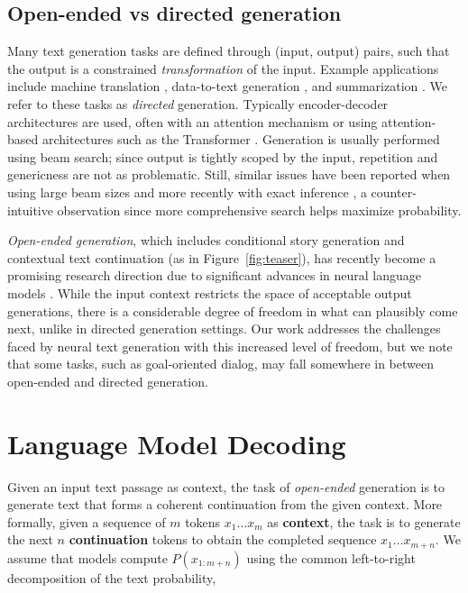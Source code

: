 \subsection{Open-ended vs directed generation} 

Many text generation tasks are defined through (input, output) pairs, such that the output is a constrained \emph{transformation} of the input. Example applications include machine translation \citep{Bahdanau2015NeuralMT}, data-to-text generation \citep{wiseman2017challenges}, and summarization \citep{nallapati2016abstractive}. We refer to these tasks as \emph{directed} generation. Typically encoder-decoder architectures are used, often with an attention mechanism \citep{Bahdanau2015NeuralMT,luong2015effective} or using attention-based architectures such as the Transformer \citep{vaswani2017attention}. Generation is usually performed using beam search; since output is tightly scoped by the input, repetition and genericness are not as problematic. Still, similar issues have been reported when using large beam sizes \citep{koehn2017six} and more recently with exact inference \citep{stahlberg2019nmt}, a counter-intuitive observation since more comprehensive search helps maximize probability.

\emph{Open-ended generation}, which includes conditional story generation and contextual text continuation (as in Figure~\ref{fig:teaser}), has recently become a promising research direction due to significant advances in neural language models \citep{clark2018-neural,holtzman2018l2w, fan2018hierarchical,peng2018-towards,radford2019BetterLMs}. While the input context restricts the space of acceptable output generations, there is a considerable degree of freedom in what can plausibly come next, unlike in directed generation settings. Our work addresses the challenges faced by neural text generation with this increased level of freedom, but we note that some tasks, such as goal-oriented dialog, may fall somewhere in between open-ended and directed generation.

 \section{Language Model Decoding}

Given an input text passage as context, the task of \emph{open-ended} generation is to generate text that forms a coherent continuation from the given context. More formally, given a sequence of $m$ tokens $x_1 \ldots x_m$ as \textbf{context}, the task is to generate the next $n$ \textbf{continuation} tokens to obtain the completed sequence $x_1 \ldots x_{m+n}$. We assume that models compute $P(x_{1:m+n})$ using the common left-to-right decomposition of the text probability,

